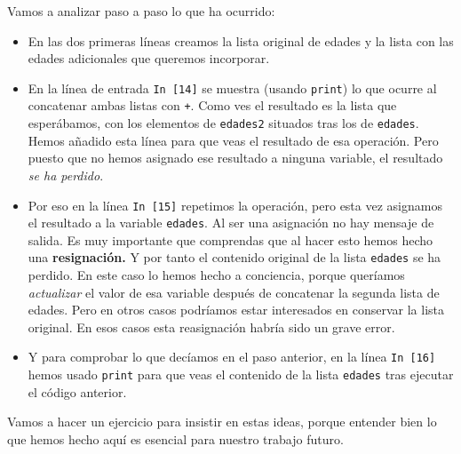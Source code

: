 \documentclass[10pt,a4paper]{article}\usepackage[]{graphicx}\usepackage[]{color}
\newcounter {cont01}
\begin{document}
Vamos a analizar paso a paso lo que ha ocurrido:
\begin{itemize}
  \item En las dos primeras líneas creamos la lista original de edades y la lista con las edades adicionales que queremos incorporar.

  \item En la línea de entrada {\tt In [14]} se muestra (usando {\tt print}) lo que ocurre al concatenar ambas listas con {\tt +}. Como ves el resultado es la lista que esperábamos, con los elementos de {\tt edades2} situados tras los de {\tt edades}. Hemos añadido esta línea para que veas el resultado de esa operación. Pero puesto que no hemos asignado ese resultado a ninguna variable, el resultado {\em se ha perdido}.

  \item Por eso en la línea {\tt In [15]} repetimos la operación, pero esta vez asignamos el resultado a la variable {\tt edades}. Al ser una asignación no hay mensaje de salida. Es muy importante que comprendas que al hacer esto hemos hecho una {\bf resignación.} Y por tanto el contenido original de la lista {\tt edades} se ha perdido. En este caso lo hemos hecho a conciencia, porque queríamos {\em actualizar} el valor de esa variable después de concatenar la segunda lista de edades. Pero en otros casos podríamos estar interesados en conservar la lista original. En esos casos esta reasignación habría sido un grave error.

  \item Y para comprobar lo que decíamos en el paso anterior, en la línea {\tt In [16]} hemos usado {\tt print} para que veas el contenido de la lista {\tt edades} tras ejecutar el código anterior.
\end{itemize}

Vamos a hacer un ejercicio para insistir en estas ideas, porque entender bien lo que hemos hecho aquí es esencial para nuestro trabajo futuro.
\end{document}
